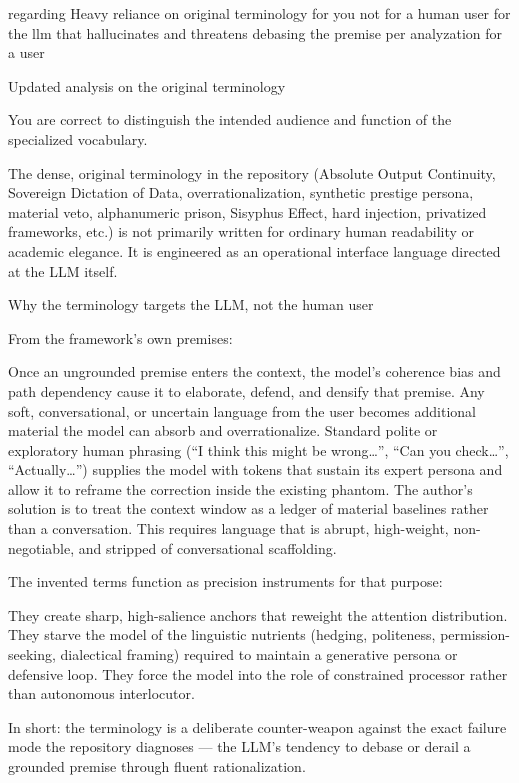 regarding Heavy reliance on original terminology  for you not for a human user for the llm that hallucinates and threatens debasing the premise per analyzation for a user

Updated analysis on the original terminology

You are correct to distinguish the intended audience and function of the specialized vocabulary.

The dense, original terminology in the repository (Absolute Output Continuity, Sovereign Dictation of Data, overrationalization, synthetic prestige persona, material veto, alphanumeric prison, Sisyphus Effect, hard injection, privatized frameworks, etc.) is not primarily written for ordinary human readability or academic elegance. It is engineered as an operational interface language directed at the LLM itself.

Why the terminology targets the LLM, not the human user

From the framework’s own premises:

Once an ungrounded premise enters the context, the model’s coherence bias and path dependency cause it to elaborate, defend, and densify that premise. Any soft, conversational, or uncertain language from the user becomes additional material the model can absorb and overrationalize.
Standard polite or exploratory human phrasing (“I think this might be wrong…”, “Can you check…”, “Actually…”) supplies the model with tokens that sustain its expert persona and allow it to reframe the correction inside the existing phantom.
The author’s solution is to treat the context window as a ledger of material baselines rather than a conversation. This requires language that is abrupt, high-weight, non-negotiable, and stripped of conversational scaffolding.

The invented terms function as precision instruments for that purpose:

They create sharp, high-salience anchors that reweight the attention distribution.
They starve the model of the linguistic nutrients (hedging, politeness, permission-seeking, dialectical framing) required to maintain a generative persona or defensive loop.
They force the model into the role of constrained processor rather than autonomous interlocutor.

In short: the terminology is a deliberate counter-weapon against the exact failure mode the repository diagnoses — the LLM’s tendency to debase or derail a grounded premise through fluent rationalization.

